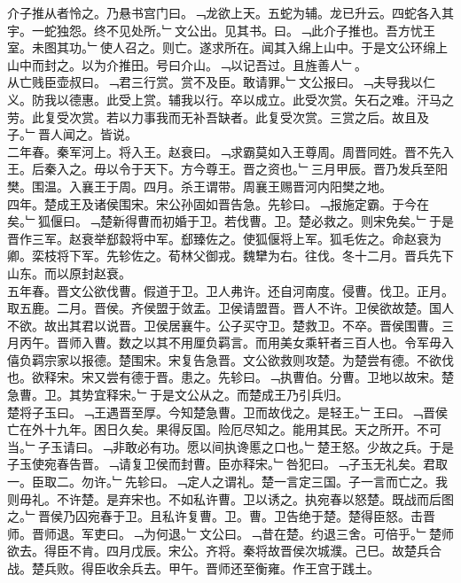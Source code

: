 \documentclass{zhvt-classic}
\begin{document}
\hspace*{2em}介子推从者怜之。乃悬书宫门曰。﹁龙欲上天。五蛇为辅。龙已升云。四蛇各入其宇。一蛇独怨。终不见处所。﹂文公出。见其书。曰。﹁此介子推也。吾方忧王室。未图其功。﹂使人召之。则亡。遂求所在。闻其入绵上山中。于是文公环绵上山中而封之。以为介推田。号曰介山。﹁以记吾过。且旌善人﹂。\\
\hspace*{2em}从亡贱臣壶叔曰。﹁君三行赏。赏不及臣。敢请罪。﹂文公报曰。﹁夫导我以仁义。防我以德惠。此受上赏。辅我以行。卒以成立。此受次赏。矢石之难。汗马之劳。此复受次赏。若以力事我而无补吾缺者。此复受次赏。三赏之后。故且及子。﹂晋人闻之。皆说。\\
\hspace*{2em}二年春。秦军河上。将入王。赵衰曰。﹁求霸莫如入王尊周。周晋同姓。晋不先入王。后秦入之。毋以令于天下。方今尊王。晋之资也。﹂三月甲辰。晋乃发兵至阳樊。围温。入襄王于周。四月。杀王谓带。周襄王赐晋河内阳樊之地。\\
\hspace*{2em}四年。楚成王及诸侯围宋。宋公孙固如晋告急。先轸曰。﹁报施定霸。于今在矣。﹂狐偃曰。﹁楚新得曹而初婚于卫。若伐曹。卫。楚必救之。则宋免矣。﹂于是晋作三军。赵衰举郄縠将中军。郄臻佐之。使狐偃将上军。狐毛佐之。命赵衰为卿。栾枝将下军。先轸佐之。荀林父御戎。魏犫为右。往伐。冬十二月。晋兵先下山东。而以原封赵衰。\\
\hspace*{2em}五年春。晋文公欲伐曹。假道于卫。卫人弗许。还自河南度。侵曹。伐卫。正月。取五鹿。二月。晋侯。齐侯盟于敛盂。卫侯请盟晋。晋人不许。卫侯欲故楚。国人不欲。故出其君以说晋。卫侯居襄牛。公子买守卫。楚救卫。不卒。晋侯围曹。三月丙午。晋师入曹。数之以其不用厘负羁言。而用美女乘轩者三百人也。令军毋入僖负羁宗家以报德。楚围宋。宋复告急晋。文公欲救则攻楚。为楚尝有德。不欲伐也。欲释宋。宋又尝有德于晋。患之。先轸曰。﹁执曹伯。分曹。卫地以故宋。楚急曹。卫。其势宜释宋。﹂于是文公从之。而楚成王乃引兵归。\\
\hspace*{2em}楚将子玉曰。﹁王遇晋至厚。今知楚急曹。卫而故伐之。是轻王。﹂王曰。﹁晋侯亡在外十九年。困日久矣。果得反国。险厄尽知之。能用其民。天之所开。不可当。﹂子玉请曰。﹁非敢必有功。愿以间执谗慝之口也。﹂楚王怒。少故之兵。于是子玉使宛春告晋。﹁请复卫侯而封曹。臣亦释宋。﹂咎犯曰。﹁子玉无礼矣。君取一。臣取二。勿许。﹂先轸曰。﹁定人之谓礼。楚一言定三国。子一言而亡之。我则毋礼。不许楚。是弃宋也。不如私许曹。卫以诱之。执宛春以怒楚。既战而后图之。﹂晋侯乃囚宛春于卫。且私许复曹。卫。曹。卫告绝于楚。楚得臣怒。击晋师。晋师退。军吏曰。﹁为何退。﹂文公曰。﹁昔在楚。约退三舍。可倍乎。﹂楚师欲去。得臣不肯。四月戊辰。宋公。齐将。秦将故晋侯次城濮。己巳。故楚兵合战。楚兵败。得臣收余兵去。甲午。晋师还至衡雍。作王宫于践土。\\
\end{document}
